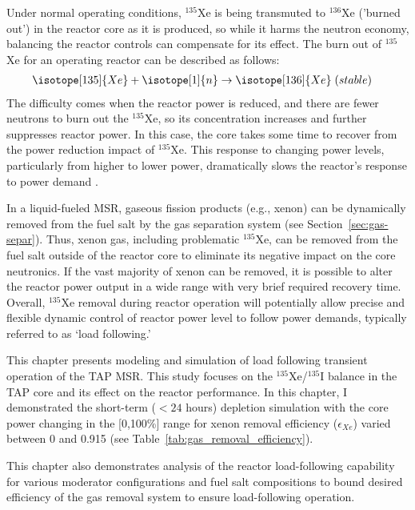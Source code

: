 Under normal operating conditions, $^{135}$Xe is being 
transmuted to $^{136}$Xe ('burned out') in the reactor core as it is produced, 
so while it harms the neutron economy, balancing the reactor controls can 
compensate for its effect. The burn out of $^{135}$Xe for an operating reactor 
can be described as follows:
\begin{align}
& \isotope[135]{Xe}+\isotope[1]{n}\rightarrow \isotope[136]{Xe} \;(stable)
\end{align}
The difficulty comes when the reactor power is reduced, and there are fewer 
neutrons to burn out the $^{135}$Xe, so its concentration increases and 
further suppresses reactor power. In this case, the core takes some time to 
recover from the power reduction impact of $^{135}$Xe. This response to 
changing power levels, particularly from higher to lower power, 
dramatically slows the reactor's response to power demand
\cite{lokhov_load-following_2011}. 

In a liquid-fueled \gls{MSR}, gaseous fission products (e.g., xenon) can be 
dynamically removed from the fuel salt by the gas separation system (see 
Section~\ref{sec:gas-separ}). Thus, xenon gas, including problematic 
$^{135}$Xe, can be removed from the fuel salt outside of the reactor core to 
eliminate its negative impact on the core neutronics. If the vast majority of 
xenon can be removed, it is possible to alter the reactor power output in 
a wide range with very brief required recovery time. Overall, $^{135}$Xe 
removal during reactor operation will potentially allow precise and flexible 
dynamic control of reactor power level to follow power demands, typically 
referred to as `load following.'

This chapter presents modeling and simulation of load following transient 
operation of the \gls{TAP} \gls{MSR}. This study focuses on the 
$^{135}$Xe/$^{135}$I balance in the \gls{TAP} core and its effect on the 
reactor performance. In this chapter, I demonstrated the short-term ($<24$ 
hours) depletion simulation with the core power changing in the [0,100\%] 
range for xenon removal efficiency ($\epsilon_{Xe}$) varied between 0 and 
0.915 (see Table~\ref{tab:gas_removal_efficiency}). 

This chapter also demonstrates analysis of the reactor load-following 
capability for various moderator configurations and fuel salt compositions to 
bound desired efficiency of the gas removal system to ensure load-following 
operation. 


